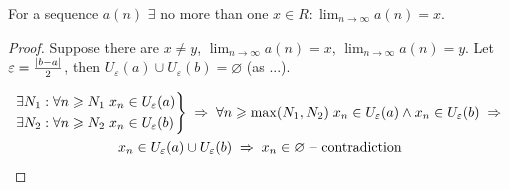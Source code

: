 \begin{theorem}
    For a sequence $a(n)$ $\exists$ no more than one $x \in R : \lim_{n \rightarrow \infty} a(n) = x$.
\end{theorem}
\begin{proof}
    Suppose there are $x \ne y$, $\lim_{n \rightarrow \infty} a(n) = x$, $\lim_{n \rightarrow \infty} a(n) = y$. Let $\varepsilon = \frac{\left\lvert b - a \right\rvert}{2}$, then $U_\varepsilon(a) \cup U_\varepsilon(b) = \varnothing$ (as ...).

    \begin{multline*}
        \begin{rcases*}
            \exists N_1 : \forall n \ge N_1 \; x_n \in U_\varepsilon(a) \\
            \exists N_2 : \forall n \ge N_2 \; x_n \in U_\varepsilon(b)
        \end{rcases*}
        \thus \forall n \ge \max(N_1, N_2) \; x_n \in U_\varepsilon(a) \land x_n \in U_\varepsilon(b)
        \thus \\ x_n \in U_\varepsilon(a) \cup U_\varepsilon(b)
        \thus x_n \in \varnothing \text{ -- contradiction}
    \end{multline*}
\end{proof}